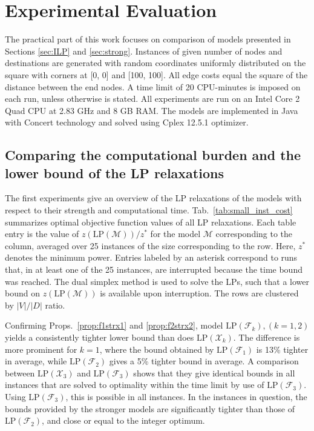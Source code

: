 \section{Experimental Evaluation}
\label{sec:exp}

The practical part of this work focuses on comparison of models presented in Sections \ref{sec:ILP} and \ref{sec:strong}.
Instances of given number of nodes and destinations are generated with random coordinates uniformly distributed on the square with corners at [0, 0] and [100, 100].
All edge costs equal the square of the distance between the end nodes.
A time limit of 20 CPU-minutes is imposed on each run, unless otherwise is stated.
All experiments are run on an Intel Core 2 Quad CPU at 2.83 GHz and 8 GB RAM.
The models are implemented in Java with Concert technology and solved using Cplex 12.5.1 optimizer.
 
\subsection{Comparing the computational burden and the lower bound of the LP relaxations}
\label{sec:expcomplp}

The first experiments give an overview of the LP relaxations of the models with respect to their strength and computational time. 
Tab.\ \ref{tab:small_inst_cost} summarizes optimal objective function values of all LP relaxations.
Each table entry is the value of $z(\text{LP}(\mathcal{M}))/z^*$ for the model $\mathcal{M}$ corresponding to the column,
averaged over 25 instances of the size corresponding to the row.
Here, $z^*$ denotes the minimum power.
Entries labeled by an asterisk correspond to runs that, in at least one of the 25 instances, are interrupted because the time bound was reached.
The dual simplex method is used to solve the LPs, such that a lower bound on $z(\text{LP}(\mathcal{M}))$ is available upon interruption.
The rows are clustered by $|V|/|D|$ ratio.

Confirming Props.\ \ref{prop:f1strx1} and \ref{prop:f2strx2}, model $\text{LP}(\mathcal{F}_k), (k=1,2)$ yields a consistently tighter lower bound than does $\text{LP}(\mathcal{X}_k)$. 
The difference is more prominent for $k=1$, where the bound obtained by $\text{LP}(\mathcal{F}_1)$ is 13\% tighter in average, while $\text{LP}(\mathcal{F}_2)$ gives a 5\% tighter bound in average.
A comparison between $\text{LP}(\mathcal{X}_3)$ and $\text{LP}(\mathcal{F}_3)$ shows that they give identical bounds in all instances that are solved to optimality within the time limit by use of
$\text{LP}(\mathcal{F}_3)$.
Using $\text{LP}(\mathcal{F}_3)$, this is possible in all instances.
In the instances in question, the bounds provided by the stronger models are significantly tighter than those of $\text{LP}(\mathcal{F}_2)$, and close or equal to the integer optimum.

